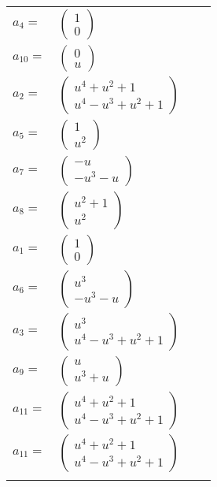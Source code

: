 \documentclass[1p]{elsarticle_modified}
\theoremstyle{definition}
\begin{document}
\begin{tabular}{m{7pt} m{180pt} m{7pt} m{180pt} }
\flushright $a_{4}=$&$\begin{pmatrix}1\\0\end{pmatrix}$ \\
\flushright $a_{10}=$&$\begin{pmatrix}0\\u\end{pmatrix}$ \\
\flushright $a_{2}=$&$\begin{pmatrix}u^4+u^2+1\\u^4- u^3+u^2+1\end{pmatrix}$ \\
\flushright $a_{5}=$&$\begin{pmatrix}1\\u^2\end{pmatrix}$ \\
\flushright $a_{7}=$&$\begin{pmatrix}- u\\- u^3- u\end{pmatrix}$ \\
\flushright $a_{8}=$&$\begin{pmatrix}u^2+1\\u^2\end{pmatrix}$ \\
\flushright $a_{1}=$&$\begin{pmatrix}1\\0\end{pmatrix}$ \\
\flushright $a_{6}=$&$\begin{pmatrix}u^3\\- u^3- u\end{pmatrix}$ \\
\flushright $a_{3}=$&$\begin{pmatrix}u^3\\u^4- u^3+u^2+1\end{pmatrix}$ \\
\flushright $a_{9}=$&$\begin{pmatrix}u\\u^3+u\end{pmatrix}$ \\
\flushright $a_{11}=$&$\begin{pmatrix}u^4+u^2+1\\u^4- u^3+u^2+1\end{pmatrix}$\\ \flushright $a_{11}=$&$\begin{pmatrix}u^4+u^2+1\\u^4- u^3+u^2+1\end{pmatrix}$\\&\end{tabular}
\end{document}
